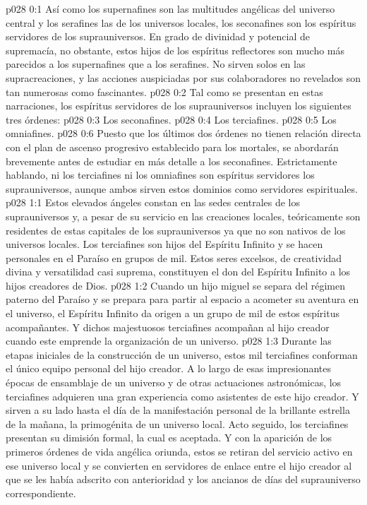 \author{Mensajero poderoso}
\vs p028 0:1 Así como los supernafines son las multitudes angélicas del universo central y los serafines las de los universos locales, los seconafines son los espíritus servidores de los suprauniversos. En grado de divinidad y potencial de supremacía, no obstante, estos hijos de los espíritus reflectores son mucho más parecidos a los supernafines que a los serafines. No sirven solos en las supracreaciones, y las acciones auspiciadas por sus colaboradores no revelados son tan numerosas como fascinantes.
\vs p028 0:2 \pc Tal como se presentan en estas narraciones, los espíritus servidores de los suprauniversos incluyen los siguientes tres órdenes:
\vs p028 0:3 Los seconafines.
\vs p028 0:4 Los terciafines.
\vs p028 0:5 Los omniafines.
\vs p028 0:6 \pc Puesto que los últimos dos órdenes no tienen relación directa con el plan de ascenso progresivo establecido para los mortales, se abordarán brevemente antes de estudiar en más detalle a los seconafines. Estrictamente hablando, ni los terciafines ni los omniafines son espíritus servidores  los suprauniversos, aunque ambos sirven  estos dominios como servidores espirituales.
\vs p028 1:1 Estos elevados ángeles constan en las sedes centrales de los suprauniversos y, a pesar de su servicio en las creaciones locales, teóricamente son residentes de estas capitales de los suprauniversos ya que no son nativos de los universos locales. Los terciafines son hijos del Espíritu Infinito y se hacen personales en el Paraíso en grupos de mil. Estos seres excelsos, de creatividad divina y versatilidad casi suprema, constituyen el don del Espíritu Infinito a los hijos creadores de Dios.
\vs p028 1:2 Cuando un hijo miguel se separa del régimen paterno del Paraíso y se prepara para partir al espacio a acometer su aventura en el universo, el Espíritu Infinito da origen a un grupo de mil de estos espíritus acompañantes. Y dichos majestuosos terciafines acompañan al hijo creador cuando este emprende la organización de un universo.
\vs p028 1:3 Durante las etapas iniciales de la construcción de un universo, estos mil terciafines conforman el único equipo personal del hijo creador. A lo largo de esas impresionantes épocas de ensamblaje de un universo y de otras actuaciones astronómicas, los terciafines adquieren una gran experiencia como asistentes de este hijo creador. Y sirven a su lado hasta el día de la manifestación personal de la brillante estrella de la mañana, la primogénita de un universo local. Acto seguido, los terciafines presentan su dimisión formal, la cual es aceptada. Y con la aparición de los primeros órdenes de vida angélica oriunda, estos se retiran del servicio activo en ese universo local y se convierten en servidores de enlace entre el hijo creador al que se les había adscrito con anterioridad y los ancianos de días del suprauniverso correspondiente.
